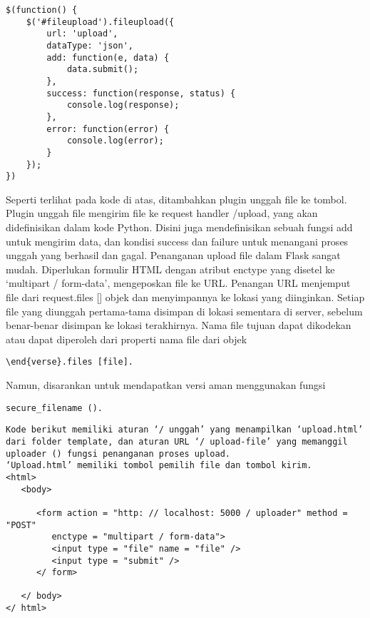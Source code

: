 \documentclass[12pt,a4paper]{article}
\begin{document}
\begin{verbatim}
$(function() {
    $('#fileupload').fileupload({
        url: 'upload',
        dataType: 'json',
        add: function(e, data) {
            data.submit();
        },
        success: function(response, status) {
            console.log(response);
        },
        error: function(error) {
            console.log(error);
        }
    });
})
\end{verbatim}
Seperti terlihat pada kode di atas, ditambahkan plugin unggah file ke tombol. Plugin unggah file mengirim file ke request handler /upload, yang akan didefinisikan dalam kode Python. Disini juga mendefinisikan sebuah fungsi add untuk mengirim data, dan kondisi success dan failure untuk menangani proses unggah yang berhasil dan gagal.
Penanganan upload file dalam Flask sangat mudah. Diperlukan formulir HTML dengan atribut enctype yang disetel ke ‘multipart / form-data’, mengeposkan file ke URL. Penangan URL menjemput file dari request.files [] objek dan menyimpannya ke lokasi yang diinginkan. Setiap file yang diunggah pertama-tama disimpan di lokasi sementara di server, sebelum benar-benar disimpan ke lokasi terakhirnya. Nama file tujuan dapat dikodekan atau dapat diperoleh dari properti nama file dari objek 
\begin{verbatim}
\end{verse}.files [file]. 
\end{verbatim}
Namun, disarankan untuk mendapatkan versi aman menggunakan fungsi 
\begin{verbatim}
secure_filename ().
\end{verbatim}
\begin{verbatim}
Kode berikut memiliki aturan ‘/ unggah’ yang menampilkan ‘upload.html’ dari folder template, dan aturan URL ‘/ upload-file’ yang memanggil uploader () fungsi penanganan proses upload.
‘Upload.html’ memiliki tombol pemilih file dan tombol kirim.
<html>
   <body>
   
      <form action = "http: // localhost: 5000 / uploader" method = "POST"
         enctype = "multipart / form-data">
         <input type = "file" name = "file" />
         <input type = "submit" />
      </ form>
      
   </ body>
</ html>
\end{verbatim}
\end{document}
